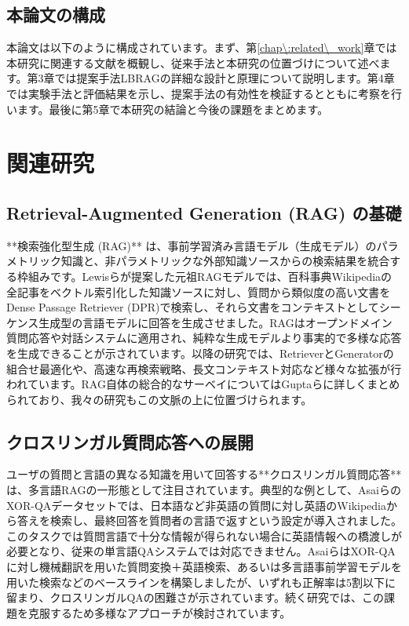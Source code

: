 \documentclass[12pt]{bxjsreport}
\begin{document}
\section{本論文の構成}

本論文は以下のように構成されています。まず、第\ref{chap\:related\_work}章では本研究に関連する文献を概観し、従来手法と本研究の位置づけについて述べます。第3章では提案手法LBRAGの詳細な設計と原理について説明します。第4章では実験手法と評価結果を示し、提案手法の有効性を検証するとともに考察を行います。最後に第5章で本研究の結論と今後の課題をまとめます。

\chapter{関連研究}

\section{Retrieval-Augmented Generation (RAG) の基礎}
**検索強化型生成 (RAG)** は、事前学習済み言語モデル（生成モデル）のパラメトリック知識と、非パラメトリックな外部知識ソースからの検索結果を統合する枠組みです。Lewisらが提案した元祖RAGモデルでは、百科事典Wikipediaの全記事をベクトル索引化した知識ソースに対し、質問から類似度の高い文書をDense Passage Retriever (DPR)で検索し、それら文書をコンテキストとしてシーケンス生成型の言語モデルに回答を生成させました。RAGはオープンドメイン質問応答や対話システムに適用され、純粋な生成モデルより事実的で多様な応答を生成できることが示されています。以降の研究では、RetrieverとGeneratorの組合せ最適化や、高速な再検索戦略、長文コンテキスト対応など様々な拡張が行われています。RAG自体の総合的なサーベイについてはGuptaらに詳しくまとめられており、我々の研究もこの文脈の上に位置づけられます。

\section{クロスリンガル質問応答への展開}

ユーザの質問と言語の異なる知識を用いて回答する**クロスリンガル質問応答**は、多言語RAGの一形態として注目されています。典型的な例として、AsaiらのXOR-QAデータセットでは、日本語など非英語の質問に対し英語のWikipediaから答えを検索し、最終回答を質問者の言語で返すという設定が導入されました。このタスクでは質問言語で十分な情報が得られない場合に英語情報への橋渡しが必要となり、従来の単言語QAシステムでは対応できません。AsaiらはXOR-QAに対し機械翻訳を用いた質問変換＋英語検索、あるいは多言語事前学習モデルを用いた検索などのベースラインを構築しましたが、いずれも正解率は5割以下に留まり、クロスリンガルQAの困難さが示されています。続く研究では、この課題を克服するため多様なアプローチが検討されています。
\end{document}
